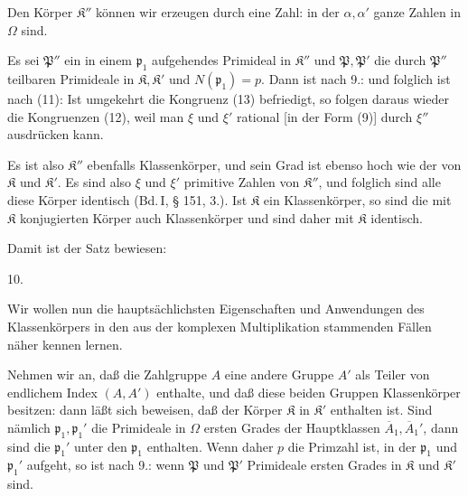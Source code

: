 Den Körper $\mathfrak{K}''$ können wir erzeugen durch eine Zahl:
in der $\alpha, \alpha'$ ganze Zahlen in $\Omega$ sind.

Es sei $\mathfrak{P}''$ ein in einem $\mathfrak{p}_1$ aufgehendes Primideal in $\mathfrak{K}''$ und
$\mathfrak{P}, \mathfrak{P}'$ die durch $\mathfrak{P}''$ teilbaren Primideale in $\mathfrak{K}, \mathfrak{K}'$ und $N(\mathfrak{p}_1) = p$.
Dann ist nach 9.:
und folglich ist nach (11):
Ist umgekehrt die Kongruenz (13) befriedigt, so folgen daraus wieder die
Kongruenzen (12), weil man $\xi$ und $\xi'$ rational [in der Form (9)] durch
$\xi''$ ausdrücken kann.

Es ist also $\mathfrak{K}''$ ebenfalls Klassenkörper, und sein Grad ist ebenso
hoch wie der von $\mathfrak{K}$ und $\mathfrak{K}'$. Es sind also $\xi$ und $\xi'$ primitive
Zahlen von $\mathfrak{K}''$, und folglich sind alle diese Körper identisch (Bd.\,I,
§ 151, 3.). Ist $\mathfrak{K}$ ein Klassenkörper, so sind die mit $\mathfrak{K}$ konjugierten
Körper auch Klassenkörper und sind daher mit $\mathfrak{K}$ identisch.

Damit ist der Satz bewiesen:

10. 

Wir wollen nun die hauptsächlichsten Eigenschaften und Anwendungen des
Klassenkörpers in den aus der komplexen Multiplikation stammenden Fällen
näher kennen lernen.

Nehmen wir an, daß die Zahlgruppe $A$ eine andere Gruppe $A'$ als Teiler von
endlichem Index $(A, A')$ enthalte, und daß diese beiden Gruppen
Klassenkörper besitzen:
dann läßt sich beweisen, daß der Körper $\mathfrak{K}$ in $\mathfrak{K}'$ enthalten ist. Sind
nämlich $\mathfrak{p}_1, \mathfrak{p}_1'$ die Primideale in $\Omega$ ersten Grades der
Hauptklassen $\overline{A}_1, \overline{A}_1'$, dann sind die $\mathfrak{p}_1'$ unter den $\mathfrak{p}_1$
enthalten. Wenn daher $p$ die Primzahl ist, in der $\mathfrak{p}_1$ und $\mathfrak{p}_1'$ aufgeht,
so ist nach 9.:
wenn $\mathfrak{P}$ und $\mathfrak{P}'$ Primideale ersten Grades in $\mathfrak{K}$ und $\mathfrak{K}'$ sind.
